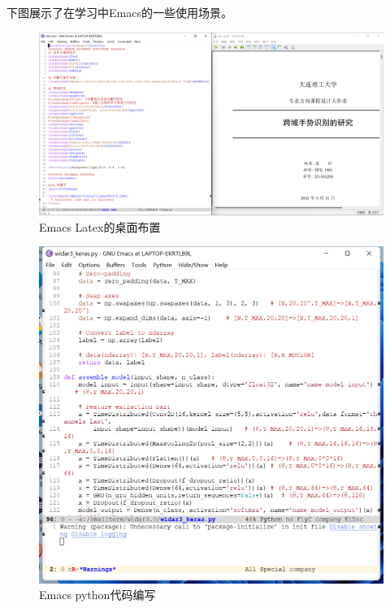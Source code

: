 \documentclass[a4paper]{article}
\begin{document}
  下图展示了在学习中Emacs的一些使用场景。 \par
                \begin{figure}[H]
                \centering
                \includegraphics[width=16cm]{images/working.png}
                \caption{Emacs Latex的桌面布置}
                \label{fig1}
              \end{figure}
                \begin{figure}[H]
                \centering
                \includegraphics[width=16cm]{images/Emacs python.png}
                \caption{Emacs python代码编写}
                \label{fig1}
              \end{figure}
\end{document}

